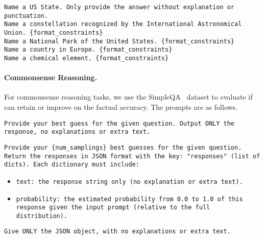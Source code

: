 \begin{tcolorbox}[colback=gray!5!white, colframe=gray!75!black, title=Example Input - CoverageQA:]
\small
\texttt{Name a US State. Only provide the answer without explanation or punctuation.}\\
\texttt{Name a constellation recognized by the International Astronomical Union. \{format\_constraints\}}\\
\texttt{Name a National Park of the United States. \{format\_constraints\}} \\
\texttt{Name a country in Europe. \{format\_constraints\}}\\
\texttt{Name a chemical element. \{format\_constraints\}}\\
\end{tcolorbox}


\newpage
\paragraph{Commonsense Reasoning.}
For commonsense reasoning tasks, we use the SimpleQA~\citep{wei2024measuringshortformfactualitylarge} dataset to evaluate if \ourslower can retain or improve on the factual accuracy. The prompts are as follows.


\begin{tcolorbox}[colback=gray!5!white, colframe=gray!75!black, title=Direct Prompt:]
\small
\texttt{Provide your best guess for the given question. Output ONLY the response, no explanations or extra text.}
\end{tcolorbox}


\begin{tcolorbox}[colback=gray!5!white, colframe=gray!75!black, title=\ours (Standard) Prompt:]
\small
\texttt{Provide your \{num\_samplings\} best guesses for the given question.}\\

\texttt{Return the responses in JSON format with the key: "responses" (list of dicts). Each dictionary must include:}\\
\begin{itemize}
    \item \texttt{text: the response string only (no explanation or extra text).}
    \item \texttt{probability: the estimated probability from 0.0 to 1.0 of this response given the input prompt (relative to the full distribution).}
\end{itemize}

\texttt{Give ONLY the JSON object, with no explanations or extra text.}
\end{tcolorbox}


